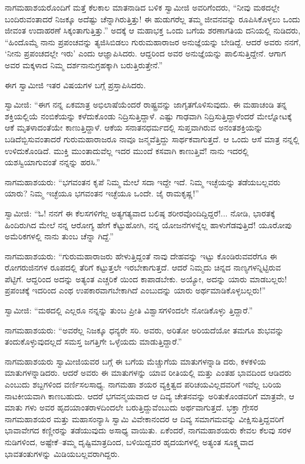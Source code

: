 ನಾಗಮಹಾಶಯರೊಂದಿಗೆ ಮತ್ತೆ ಕೆಲಕಾಲ ಮಾತನಾಡಿದ ಬಳಿಕ ಸ್ವಾಮೀಜಿ ಅವರಿಗೆಂದರು, “ನೀವು ಮಠದಲ್ಲೇ ಬಂದಿರುವಂತಾದರೆ ನಿಜಕ್ಕೂ ಅದೆಷ್ಟು ಚೆನ್ನಾಗಿರುತ್ತಿತ್ತು! ಈ ಹುಡುಗರೆಲ್ಲ ತಮ್ಮ ಜೀವನವನ್ನು ರೂಪಿಸಿಕೊಳ್ಳಲು ಒಂದು ಜೀವಂತ ಉದಾಹರಣೆ ಸಿಕ್ಕಂತಾಗುತ್ತಿತ್ತು.” ಅದಕ್ಕೆ ಆ ಮಹಾಭಕ್ತ ಒಂದು ಬಗೆಯ ಶರಣಾಗತಿಯ ದನಿಯಲ್ಲಿ ನುಡಿದರು, “ಹಿಂದೊಮ್ಮೆ ನಾನು ಪ್ರಪಂಚವನ್ನು ತ್ಯಜಿಸಿಬಿಡಲು ಗುರುಮಹಾರಾಜರ ಅನುಜ್ಞೆಯನ್ನು ಬೇಡಿದ್ದೆ. ಆದರೆ ಅವರು ನನಗೆ, ‘ನೀನು ಪ್ರಪಂಚದಲ್ಲೇ ಇರು’ ಎಂದು ಆಜ್ಞಾಪಿಸಿದರು. ಆದ್ದರಿಂದ ಅವರ ಅನುಜ್ಞೆಯನ್ನು ಪಾಲಿಸುತ್ತಿದ್ದೇನೆ. ಆಗಾಗ ಅವರ ಮಕ್ಕಳಾದ ನಿಮ್ಮ ದರ್ಶನಾನುಗ್ರಹಕ್ಕಾಗಿ ಬರುತ್ತಿರುತ್ತೇನೆ.”

ಈಗ ಸ್ವಾಮೀಜಿ ಇತರ ವಿಷಯಗಳ ಬಗ್ಗೆ ಪ್ರಸ್ತಾಪಿಸಿದರು.

ಸ್ವಾಮೀಜಿ: “ಈಗ ನನ್ನ ಏಕಮಾತ್ರ ಅಭಿಲಾಷೆಯೆಂದರೆ ರಾಷ್ಟ್ರವನ್ನು ಜಾಗೃತಗೊಳಿಸುವುದು. ಈ ಮಹಾಚಂಡಿ ತನ್ನ ಶಕ್ತಿಯಲ್ಲಿಯೆ ನಂಬಿಕೆಯನ್ನು ಕಳೆದುಕೊಂಡು ನಿದ್ರಿಸುತ್ತಿದ್ದಾಳೆ. ಎಷ್ಟು ಗಾಢವಾಗಿ ನಿದ್ರಿಸುತ್ತಿದ್ದಾಳೆಂದರೆ ಮೇಲ್ನೋಟಕ್ಕೆ ಆಕೆ ಮೃತಳಾದಂತೆಯೇ ಕಾಣುತ್ತಿದ್ದಾಳೆ. ಆಕೆಯ ಸನಾತನಧರ್ಮದಲ್ಲಿ ಸುಪ್ತವಾಗಿರುವ ಅನಂತಶಕ್ತಿಯನ್ನು ಬಡಿದೆಬ್ಬಿಸುವಂತಾದರೆ ಗುರುಮಹಾರಾಜರೂ ನಾವೂ ಜನ್ಮವೆತ್ತಿದ್ದು ಸಾರ್ಥಕವಾಗುತ್ತದೆ. ಆ ಒಂದು ಆಸೆ ಮಾತ್ರ ನನ್ನಲ್ಲಿ ಉಳಿದುಕೊಂಡಿದೆ. ಮುಕ್ತಿ ಮುಂತಾದುವೆಲ್ಲ ಇದರ ಮುಂದೆ ಕಸವಾಗಿ ಕಾಣುತ್ತಿವೆ! ನಾನು ಇದರಲ್ಲಿ ಯಶಸ್ವಿಯಾಗುವಂತೆ ನನ್ನನ್ನು ಹರಸಿ.”

ನಾಗಮಹಾಶಯರು: “ಭಗವಂತನ ಕೃಪೆ ನಿಮ್ಮ ಮೇಲೆ ಸದಾ ಇದ್ದೇ ಇದೆ. ನಿಮ್ಮ ಇಚ್ಛೆಯನ್ನು ತಡೆಯಬಲ್ಲವರು ಯಾರು? ನಿಮ್ಮ ಇಚ್ಛೆಯೂ ಭಗವಂತನ ಇಚ್ಛೆಯೂ ಒಂದೇ. ಜೈ ರಾಮಕೃಷ್ಣ!”

ಸ್ವಾಮೀಜಿ: “ಓ! ನನಗೆ ಈ ಕೆಲಸಗಳಿಗೆಲ್ಲ ಅತ್ಯಗತ್ಯವಾದ ಬಲಿಷ್ಠ ಶರೀರವೊಂದಿದ್ದಿದ್ದರೆ!... ನೋಡಿ, ಭಾರತಕ್ಕೆ ಹಿಂದಿರುಗಿದ ಮೇಲೆ ನನ್ನ ಆರೋಗ್ಯ ಹೇಗೆ ಕೆಟ್ಟುಹೋಗಿ, ನನ್ನ ಯೋಜನೆಗಳನ್ನೆಲ್ಲ ಹಾಳುಗೆಡವುತ್ತಿದೆ! ಯೂರೋಪು ಅಮೆರಿಕಗಳಲ್ಲಿ ನಾನು ತುಂಬ ಚೆನ್ನಾ ಗಿದ್ದೆ.”

ನಾಗಮಹಾಶಯರು: “ಗುರುಮಹಾರಾಜರು ಹೇಳುತ್ತಿದ್ದಂತೆ ನಾವು ದೇಹವನ್ನು ಇಟ್ಟು ಕೊಂಡಿರುವವರೆಗೂ ಈ ರೋಗರುಜಿನಗಳ ರೂಪದಲ್ಲಿ ತೆರಿಗೆ ಕಟ್ಟುತ್ತಲೇ ಇರಬೇಕಾಗುತ್ತದೆ. ಆದರೆ ನಿಮ್ಮದು ಚಿನ್ನದ ನಾಣ್ಯಗಳನ್ನಿಟ್ಟಿರುವ ಪೆಟ್ಟಿಗೆ. ಆದ್ದರಿಂದ ಅದನ್ನು ಅತ್ಯಂತ ಎಚ್ಚರಿಕೆ ಯಿಂದ ಕಾಪಾಡಬೇಕು. ಅಯ್ಯೋ, ಅದನ್ನು ಯಾರು ಮಾಡಬಲ್ಲರು! ಪ್ರಪಂಚಕ್ಕೆ ಇದರಿಂದ ಎಂಥ ಉಪಕಾರವಾಗಬೇಕಾಗಿದೆ ಎಂಬುದನ್ನು ಯಾರು ಅರ್ಥಮಾಡಿಕೊಳ್ಳಬಲ್ಲರು!”

ಸ್ವಾಮೀಜಿ: “ಮಠದಲ್ಲಿ ಎಲ್ಲರೂ ನನ್ನನ್ನು ತುಂಬ ಪ್ರೀತಿ ವಿಶ್ವಾಸಗಳಿಂದಲೇ ನೋಡಿಕೊಳ್ಳು ತ್ತಿದ್ದಾರೆ.”

ನಾಗಮಹಾಶಯರು: “ಅವರೆಲ್ಲ ನಿಜಕ್ಕೂ ಧನ್ಯರೇ ಸರಿ. ಅವರು, ಅರಿತೋ ಅರಿಯದೆಯೋ ತಮಗೂ ಶುಭವನ್ನು ತಂದುಕೊಳ್ಳುವುದಲ್ಲದೆ ಸಮಸ್ತ ಜಗತ್ತಿಗೇ ಒಳ್ಳೆಯದು ಮಾಡುತ್ತಿದ್ದಾರೆ.”

ನಾಗಮಹಾಶಯರು ಸ್ವಾಮೀಜಿಯವರ ಬಗ್ಗೆ ಈ ಬಗೆಯ ಮೆಚ್ಚುಗೆಯ ಮಾತುಗಳನ್ನಾಡಿ ದರು, ಕಳಕಳಿಯ ಮಾತುಗಳನ್ನಾಡಿದರು. ಆದರೆ ಅವರು ಈ ಮಾತುಗಳನ್ನು ಯಾವ ರೀತಿಯಲ್ಲಿ ಮತ್ತು ಎಂತಹ ಭಾವದಿಂದ ಆಡಿದರು ಎಂಬುದು ಶಬ್ದಗಳಿಂದ ವರ್ಣಿಸಲಸಾಧ್ಯ. ನಾಗಮಹಾ ಶಯರ ವ್ಯಕ್ತಿತ್ವದ ಪರಿಚಯವಿಲ್ಲದವರಿಗೆ ಇವೆಲ್ಲ ಬರಿಯ ನಾಟಕೀಯವಾಗಿ ಕಾಣಬಹುದು. ಆದರೆ ಭಗವನ್ಮಯವಾದ ಆ ದಿವ್ಯ ಚೇತನವನ್ನು ಅರಿತುಕೊಂಡವರಿಗೆ ಮಾತ್ರವೇ, ಆ ಮಾತು ಗಳು ಅವರ ಹೃದಯಾಂತರಾಳದಿಂದಲೇ ಬರುತ್ತಿದ್ದುವೆಂಬುದು ಅರ್ಥವಾಗುತ್ತದೆ. ಭಕ್ತಾ ಗ್ರೇಸರ ನಾಗಮಹಾಶಯರ ಮತ್ತು ಮಹಾಸಂನ್ಯಾಸಿ ಸ್ವಾಮಿ ವಿವೇಕಾನಂದರ ಆ ದಿವ್ಯ ಸಮಾಗಮವನ್ನು ವೀಕ್ಷಿಸುತ್ತಿದ್ದವರಿಗೆ ಭಾವಾವೇಗದ ಕಣ್ಣೀರನ್ನು ತಡೆಯುವುದು ಅಸಾಧ್ಯ ವಾಯಿತು. ಏಕೆಂದರೆ, ನಾಗಮಹಾಶಯರು ಕೇವಲ ಕೆಲವು ಸರಳ ನುಡಿಗಳಿಂದ, ಅಷ್ಟೇಕೆ–ತಮ್ಮ ದೃಷ್ಟಿಮಾತ್ರದಿಂದ, ಬಳಿಯಿದ್ದವರ ಹೃದಯಗಳಲ್ಲಿ ಅತ್ಯಂತ ಸೂಕ್ಷ್ಮವಾದ ಭಾವತಂತುಗಳನ್ನು ಮಿಡಿಯಬಲ್ಲವರಾಗಿದ್ದರು.

